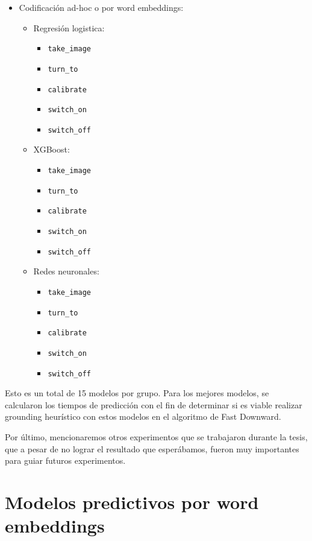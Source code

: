 \begin{itemize}
    \item Codificación ad-hoc o por word embeddings:
    \begin{itemize}
        \item Regresión logistica:
        \begin{itemize}
            \item \verb|take_image|
            \item \verb|turn_to|
            \item \verb|calibrate|
            \item \verb|switch_on|
            \item \verb|switch_off|
        \end{itemize}
        \item XGBoost:
        \begin{itemize}
            \item \verb|take_image|
            \item \verb|turn_to|
            \item \verb|calibrate|
            \item \verb|switch_on|
            \item \verb|switch_off|
        \end{itemize}
        \item Redes neuronales:
        \begin{itemize}
            \item \verb|take_image|
            \item \verb|turn_to|
            \item \verb|calibrate|
            \item \verb|switch_on|
            \item \verb|switch_off|
        \end{itemize}
    \end{itemize}
\end{itemize}

Esto es un total de 15 modelos por grupo. Para los mejores modelos, se calcularon los tiempos de predicción con el fin de determinar si es viable realizar grounding heurístico con estos modelos en el algoritmo de Fast Downward.

Por último, mencionaremos otros experimentos que se trabajaron durante la tesis, que a pesar de no lograr el resultado que esperábamos, fueron muy importantes para guiar futuros experimentos.

\section{Modelos predictivos por word embeddings}
\label{exp:ad-hoc}

